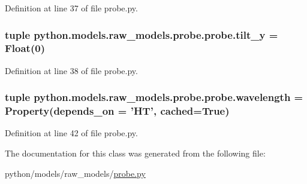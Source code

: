 Definition at line 37 of file probe.\-py.

\hypertarget{classpython_1_1models_1_1raw__models_1_1probe_1_1probe_a0b69db4cc0341378a8f86aff6e7012d5}{
\subsubsection[{tilt\-\_\-y}]{\setlength{\rightskip}{0pt plus 5cm}tuple python.\-models.\-raw\-\_\-models.\-probe.\-probe.\-tilt\-\_\-y = Float(0)\hspace{0.3cm}{\ttfamily [static]}}}\label{classpython_1_1models_1_1raw__models_1_1probe_1_1probe_a0b69db4cc0341378a8f86aff6e7012d5}


Definition at line 38 of file probe.\-py.

\hypertarget{classpython_1_1models_1_1raw__models_1_1probe_1_1probe_a3a05cfce65087be2c959df7b60d07905}{
\subsubsection[{wavelength}]{\setlength{\rightskip}{0pt plus 5cm}tuple python.\-models.\-raw\-\_\-models.\-probe.\-probe.\-wavelength = Property(depends\-\_\-on = '{\bf H\-T}', cached=True)\hspace{0.3cm}{\ttfamily [static]}}}\label{classpython_1_1models_1_1raw__models_1_1probe_1_1probe_a3a05cfce65087be2c959df7b60d07905}


Definition at line 42 of file probe.\-py.



The documentation for this class was generated from the following file\-:\begin{DoxyCompactItemize}
\item 
python/models/raw\-\_\-models/\hyperlink{probe_8py}{probe.\-py}\end{DoxyCompactItemize}
